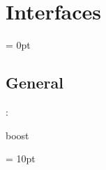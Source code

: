 
\section{Interfaces} 


\parskip = 0pt

\vspace{3mm} \subsection*{General}

: 

boost
\vspace{2mm}

\vspace{5mm}\parskip = 10pt 
